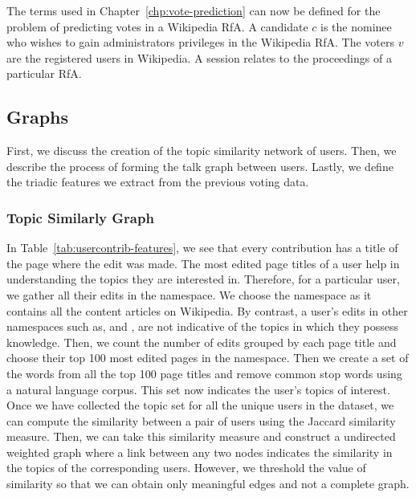 The terms used in Chapter~\ref{chp:vote-prediction} can now be defined for the problem of predicting votes in a Wikipedia RfA.
A candidate $c$ is the nominee who wishes to gain administrators privileges in the Wikipedia RfA.
The voters $v$ are the registered users in Wikipedia.
A session relates to the proceedings of a particular RfA.
\subsection{Graphs}
First, we discuss the creation of the topic similarity network of users.
Then, we describe the process of forming the talk graph between users.
Lastly, we define the triadic features we extract from the previous voting data. 

\subsubsection{Topic Similarly Graph}
In Table~\ref{tab:usercontrib-features}, we see that every contribution has a title of the page where the edit was made.
The most edited page titles of a user help in understanding the topics they are interested in.
Therefore, for a particular user, we gather all their edits in the \mainNS namespace.
We choose the \mainNS namespace as it contains all the content articles on Wikipedia.
By contrast, a user's edits in other namespaces such as, \userNS and \helpNS, are not indicative of the topics in which they possess knowledge.
Then, we count the number of edits grouped by each page title and choose their top 100 most edited pages in the \mainNS namespace.
Then we create a set of the words from all the top 100 page titles and remove common stop words using a natural language corpus.
This set now indicates the user's topics of interest.
Once we have collected the topic set for all the unique users in the \wikirfa dataset, we can compute the similarity between a pair of users using the Jaccard similarity measure. 
Then, we can take this similarity measure and construct a undirected weighted graph where a link between any two nodes indicates the similarity in the topics of the corresponding users.
However, we threshold the value of similarity so that we can obtain only meaningful edges and not a complete graph.


